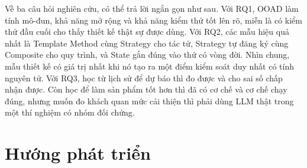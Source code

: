 Về ba câu hỏi nghiên cứu, có thể trả lời ngắn gọn như sau. Với RQ1, OOAD làm tính mô-đun, khả năng mở rộng và khả năng kiểm thử tốt lên rõ, miễn là có kiểm thử đầu cuối cho thấy thiết kế thật sự được dùng. Với RQ2, các mẫu hiệu quả nhất là Template Method cùng Strategy cho tác tử, Strategy tự đăng ký cùng Composite cho quy trình, và State gắn đúng vào thứ có vòng đời. Nhìn chung, mẫu thiết kế có giá trị nhất khi nó tạo ra một điểm kiểm soát duy nhất có tính nguyên tử. Với RQ3, học từ lịch sử để dự báo thì đo được và cho sai số chấp nhận được. Còn học để làm sản phẩm tốt hơn thì đã có cơ chế và cơ chế chạy đúng, nhưng muốn đo khách quan mức cải thiện thì phải dùng LLM thật trong một thí nghiệm có nhóm đối chứng.

\section{Hướng phát triển}

